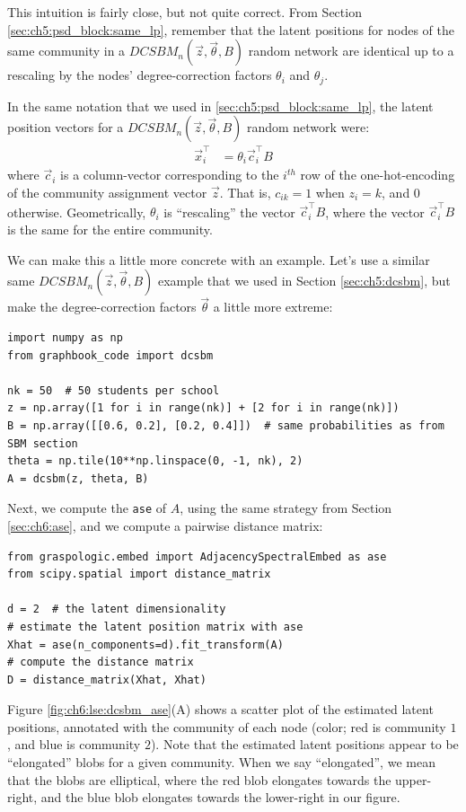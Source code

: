 This intuition is fairly close, but not quite correct. From Section \ref{sec:ch5:psd_block:same_lp}, remember that the latent positions for nodes of the same community in a $DCSBM_n(\vec z, \vec \theta, B)$ random network are identical up to a rescaling by the nodes' degree-correction factors $\theta_i$ and $\theta_j$. 

In the same notation that we used in \ref{sec:ch5:psd_block:same_lp}, the latent position vectors for a $DCSBM_n(\vec z, \vec \theta, B)$ random network were:
\begin{align*}
    \vec x_i^\top &= \theta_i \vec c_i^\top B 
\end{align*}
where $\vec c_i$ is a column-vector corresponding to the $i^{th}$ row of the one-hot-encoding of the community assignment vector $\vec z$. That is, $c_{ik} = 1$ when $z_i = k$, and $0$ otherwise. Geometrically, $\theta_i$ is ``rescaling'' the vector $\vec c_i^\top B$, where the vector $\vec c_i^\top B$ is the same for the entire community.

We can make this a little more concrete with an example. Let's use a similar same $DCSBM_n(\vec z, \vec \theta, B)$ example that we used in Section \ref{sec:ch5:dcsbm}, but make the degree-correction factors $\vec \theta$ a little more extreme:

\begin{lstlisting}[style=python]
import numpy as np
from graphbook_code import dcsbm

nk = 50  # 50 students per school
z = np.array([1 for i in range(nk)] + [2 for i in range(nk)])
B = np.array([[0.6, 0.2], [0.2, 0.4]])  # same probabilities as from SBM section
theta = np.tile(10**np.linspace(0, -1, nk), 2)
A = dcsbm(z, theta, B)
\end{lstlisting}
Next, we compute the \texttt{ase} of $A$, using the same strategy from Section \ref{sec:ch6:ase}, and we compute a pairwise distance matrix:

\begin{lstlisting}[style=python]
from graspologic.embed import AdjacencySpectralEmbed as ase
from scipy.spatial import distance_matrix

d = 2  # the latent dimensionality
# estimate the latent position matrix with ase
Xhat = ase(n_components=d).fit_transform(A)
# compute the distance matrix
D = distance_matrix(Xhat, Xhat)
\end{lstlisting}

Figure \ref{fig:ch6:lse:dcsbm_ase}(A) shows a scatter plot of the estimated latent positions, annotated with the community of each node (color; red is community $1$, and blue is community $2$). Note that the estimated latent positions appear to be ``elongated'' blobs for a given community. When we say ``elongated'', we mean that the blobs are elliptical, where the red blob elongates towards the upper-right, and the blue blob elongates towards the lower-right in our figure.

